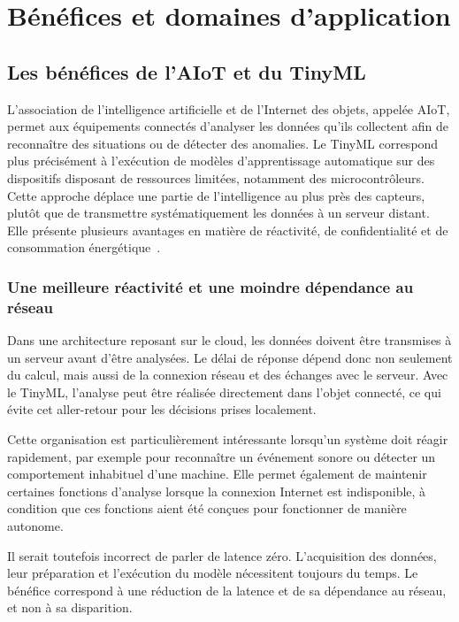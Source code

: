 \chapter{Bénéfices et domaines d'application}
\label{ch:benefices}

\section{Les bénéfices de l'AIoT et du TinyML}

L'association de l'intelligence artificielle et de l'Internet des objets,
appelée AIoT, permet aux équipements connectés d'analyser les données qu'ils
collectent afin de reconnaître des situations ou de détecter des anomalies. Le
TinyML correspond plus précisément à l'exécution de modèles d'apprentissage
automatique sur des dispositifs disposant de ressources limitées, notamment des
microcontrôleurs. Cette approche déplace une partie de l'intelligence au plus
près des capteurs, plutôt que de transmettre systématiquement les données à un
serveur distant. Elle présente plusieurs avantages en matière de réactivité, de
confidentialité et de consommation énergétique~\cite{ray2022review}.

\subsection{Une meilleure réactivité et une moindre dépendance au réseau}

Dans une architecture reposant sur le cloud, les données doivent être
transmises à un serveur avant d'être analysées. Le délai de réponse dépend donc
non seulement du calcul, mais aussi de la connexion réseau et des échanges avec
le serveur. Avec le TinyML, l'analyse peut être réalisée directement dans
l'objet connecté, ce qui évite cet aller-retour pour les décisions prises
localement.

Cette organisation est particulièrement intéressante lorsqu'un système doit
réagir rapidement, par exemple pour reconnaître un événement sonore ou détecter
un comportement inhabituel d'une machine. Elle permet également de maintenir
certaines fonctions d'analyse lorsque la connexion Internet est indisponible, à
condition que ces fonctions aient été conçues pour fonctionner de manière
autonome.

Il serait toutefois incorrect de parler de \og latence zéro\fg{}.
L'acquisition des données, leur préparation et l'exécution du modèle
nécessitent toujours du temps. Le bénéfice correspond à une réduction de la
latence et de sa dépendance au réseau, et non à sa disparition.

